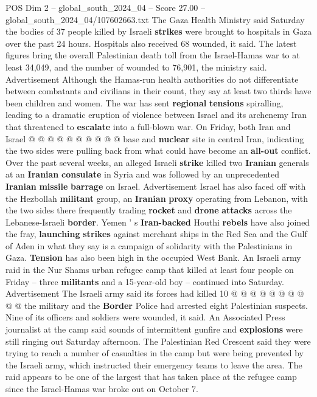 \begin{textsample}{POS Dim 2 – global\_south\_2024\_04 – Score 27.00 – global\_south\_2024\_04/107602663.txt}
The Gaza Health Ministry said Saturday the bodies of 37 people killed by Israeli \textbf{strikes} were brought to hospitals in Gaza over the past 24 hours.
Hospitals also received 68 wounded, it said.
The latest figures bring the overall Palestinian death toll from the Israel-Hamas war to at least 34,049, and the number of wounded to 76,901, the ministry said.
Advertisement Although the Hamas-run health authorities do not differentiate between combatants and civilians in their count, they say at least two thirds have been children and women.
The war has sent \textbf{regional} \textbf{tensions} spiralling, leading to a dramatic eruption of violence between Israel and its archenemy Iran that threatened to \textbf{escalate} into a full-blown war.
On Friday, both Iran and Israel @ @ @ @ @ @ @ @ @ @ base and \textbf{nuclear} site in central Iran, indicating the two sides were pulling back from what could have become an \textbf{all-out} conflict.
Over the past several weeks, an alleged Israeli \textbf{strike} killed two \textbf{Iranian} generals at an \textbf{Iranian} \textbf{consulate} in Syria and was followed by an unprecedented \textbf{Iranian} \textbf{missile} \textbf{barrage} on Israel.
Advertisement Israel has also faced off with the Hezbollah \textbf{militant} group, an \textbf{Iranian} \textbf{proxy} operating from Lebanon, with the two sides there frequently trading \textbf{rocket} and \textbf{drone} \textbf{attacks} across the Lebanese-Israeli \textbf{border}.
Yemen ' s \textbf{Iran-backed} Houthi \textbf{rebels} have also joined the fray, \textbf{launching} \textbf{strikes} against merchant ships in the Red Sea and the Gulf of Aden in what they say is a campaign of solidarity with the Palestinians in Gaza. \textbf{Tension} has also been high in the occupied West Bank.
An Israeli army raid in the Nur Shams urban refugee camp that killed at least four people on Friday -- three \textbf{militants} and a 15-year-old boy -- continued into Saturday.
Advertisement The Israeli army said its forces had killed 10 @ @ @ @ @ @ @ @ @ @ the military and the \textbf{Border} Police had arrested eight Palestinian suspects.
Nine of its officers and soldiers were wounded, it said.
An Associated Press journalist at the camp said sounds of intermittent gunfire and \textbf{explosions} were still ringing out Saturday afternoon.
The Palestinian Red Crescent said they were trying to reach a number of casualties in the camp but were being prevented by the Israeli army, which instructed their emergency teams to leave the area.
The raid appears to be one of the largest that has taken place at the refugee camp since the Israel-Hamas war broke out on October 7.

\end{textsample}
